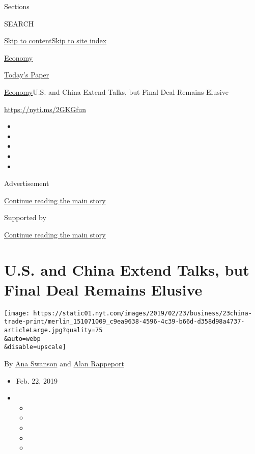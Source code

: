 Sections

SEARCH

\protect\hyperlink{site-content}{Skip to
content}\protect\hyperlink{site-index}{Skip to site index}

\href{https://www.nytimes.com/section/business/economy}{Economy}

\href{https://myaccount.nytimes.com/auth/login?response_type=cookie\&client_id=vi}{}

\href{https://www.nytimes.com/section/todayspaper}{Today's Paper}

\href{/section/business/economy}{Economy}\textbar{}U.S. and China Extend
Talks, but Final Deal Remains Elusive

\url{https://nyti.ms/2GKGfun}

\begin{itemize}
\item
\item
\item
\item
\item
\end{itemize}

Advertisement

\protect\hyperlink{after-top}{Continue reading the main story}

Supported by

\protect\hyperlink{after-sponsor}{Continue reading the main story}

\hypertarget{us-and-china-extend-talks-but-final-deal-remains-elusive}{%
\section{U.S. and China Extend Talks, but Final Deal Remains
Elusive}\label{us-and-china-extend-talks-but-final-deal-remains-elusive}}

\texttt{[image: https://static01.nyt.com/images/2019/02/23/business/23china-trade-print/merlin\_151071009\_c9ea9638-4596-4c39-b66d-d358d98a4737-articleLarge.jpg?quality=75\\\&auto=webp\\\&disable=upscale]}

By \href{https://www.nytimes.com/by/ana-swanson}{Ana Swanson} and
\href{https://www.nytimes.com/by/alan-rappeport}{Alan Rappeport}

\begin{itemize}
\item
  Feb. 22, 2019
\item
  \begin{itemize}
  \item
  \item
  \item
  \item
  \item
  \end{itemize}
\end{itemize}

